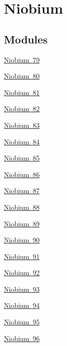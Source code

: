 \hypertarget{group___isotope_const-_niobium}{}\section{Niobium}
\label{group___isotope_const-_niobium}
\subsection*{Modules}
\begin{DoxyCompactItemize}
\item 
\mbox{\hyperlink{group___isotope_const-_niobium-_nb79}{Niobium 79}}
\item 
\mbox{\hyperlink{group___isotope_const-_niobium-_nb80}{Niobium 80}}
\item 
\mbox{\hyperlink{group___isotope_const-_niobium-_nb81}{Niobium 81}}
\item 
\mbox{\hyperlink{group___isotope_const-_niobium-_nb82}{Niobium 82}}
\item 
\mbox{\hyperlink{group___isotope_const-_niobium-_nb83}{Niobium 83}}
\item 
\mbox{\hyperlink{group___isotope_const-_niobium-_nb84}{Niobium 84}}
\item 
\mbox{\hyperlink{group___isotope_const-_niobium-_nb85}{Niobium 85}}
\item 
\mbox{\hyperlink{group___isotope_const-_niobium-_nb86}{Niobium 86}}
\item 
\mbox{\hyperlink{group___isotope_const-_niobium-_nb87}{Niobium 87}}
\item 
\mbox{\hyperlink{group___isotope_const-_niobium-_nb88}{Niobium 88}}
\item 
\mbox{\hyperlink{group___isotope_const-_niobium-_nb89}{Niobium 89}}
\item 
\mbox{\hyperlink{group___isotope_const-_niobium-_nb90}{Niobium 90}}
\item 
\mbox{\hyperlink{group___isotope_const-_niobium-_nb91}{Niobium 91}}
\item 
\mbox{\hyperlink{group___isotope_const-_niobium-_nb92}{Niobium 92}}
\item 
\mbox{\hyperlink{group___isotope_const-_niobium-_nb93}{Niobium 93}}
\item 
\mbox{\hyperlink{group___isotope_const-_niobium-_nb94}{Niobium 94}}
\item 
\mbox{\hyperlink{group___isotope_const-_niobium-_nb95}{Niobium 95}}
\item 
\mbox{\hyperlink{group___isotope_const-_niobium-_nb96}{Niobium 96}}

\end{DoxyCompactItemize}
